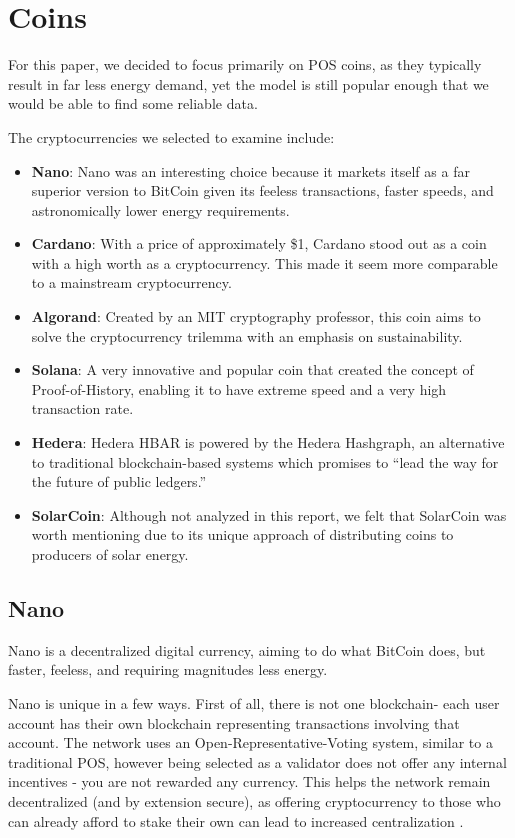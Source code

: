 \documentclass{article}
\begin{document}
\section{Coins}
For this paper, we decided to focus primarily on POS coins, as they typically result in far less energy demand, yet the model is still popular enough that we would be able to find some reliable data.

The cryptocurrencies we selected to examine include:
\begin{itemize}
    \item \textbf{Nano}: Nano was an interesting choice because it markets itself as a far superior version to BitCoin given its feeless transactions, faster speeds, and astronomically lower energy requirements.
    \item \textbf{Cardano}: With a price of approximately \$1, Cardano stood out as a coin with a high worth as a cryptocurrency. This made it seem more comparable to a mainstream cryptocurrency.
    \item \textbf{Algorand}: Created by an MIT cryptography professor, this coin aims to solve the cryptocurrency trilemma with an emphasis on sustainability.
    \item \textbf{Solana}: A very innovative and popular coin that created the concept of Proof-of-History, enabling it to have extreme speed and a very high transaction rate.
    \item \textbf{Hedera}: Hedera HBAR is powered by the Hedera Hashgraph, an alternative to traditional blockchain-based systems which promises to ``lead the way for the future of public ledgers.'' \cite{hbar}
    \item \textbf{SolarCoin}: Although not analyzed in this report, we felt that SolarCoin was worth mentioning due to its unique approach of distributing coins to producers of solar energy.
\end{itemize}

\subsection{Nano}

Nano is a decentralized digital currency, aiming to do what BitCoin does, but faster, feeless, and requiring magnitudes less energy.

Nano is unique in a few ways. First of all, there is not one blockchain- each user account has their own blockchain representing transactions involving that account. The network uses an Open-Representative-Voting system, similar to a traditional POS, however being selected as a validator does not offer any internal incentives - you are not rewarded any currency. This helps the network remain decentralized (and by extension secure), as offering cryptocurrency to those who can already afford to stake their own can lead to increased centralization \cite{orvconsensus}.
\end{document}
